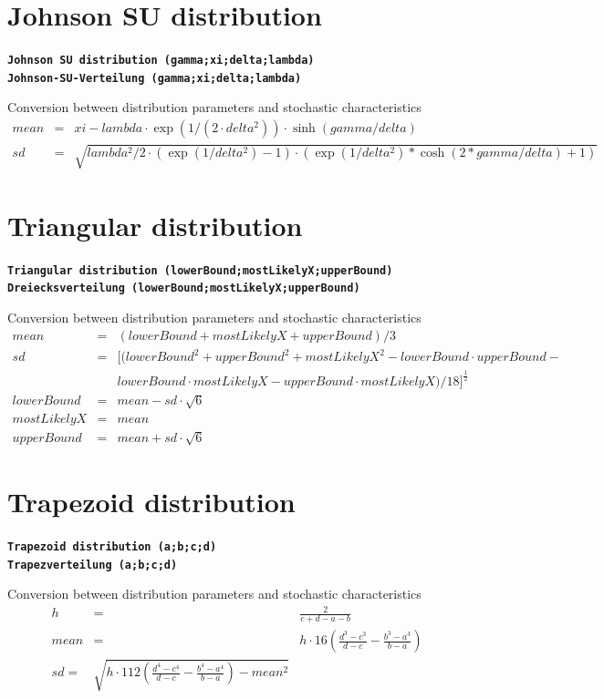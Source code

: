 \documentclass{svmono}
\def\cm#1{\textbf{\texttt{#1}}}
\begin{document}
\section*{Johnson SU distribution}
\cm{Johnson SU distribution (gamma;xi;delta;lambda)}~\\
\cm{Johnson-SU-Verteilung (gamma;xi;delta;lambda)}

Conversion between distribution parameters and stochastic characteristics
\begin{eqnarray*}
mean&=&xi-lambda\cdot\exp(1/(2\cdot delta^2))\cdot\sinh(gamma/delta)\\
sd&=&\sqrt{lambda^2/2\cdot(\exp(1/delta^2)-1)\cdot(\exp(1/delta^2)*\cosh(2*gamma/delta)+1)}
\end{eqnarray*}





\section*{Triangular distribution}
\cm{Triangular distribution (lowerBound;mostLikelyX;upperBound)}~\\
\cm{Dreiecksverteilung (lowerBound;mostLikelyX;upperBound)}

Conversion between distribution parameters and stochastic characteristics
\begin{eqnarray*}
mean&=&(lowerBound+mostLikelyX+upperBound)/3\\
sd&=&\Big[(lowerBound^2+upperBound^2+mostLikelyX^2-lowerBound\cdot upperBound-\\
~&~&lowerBound\cdot mostLikelyX-upperBound\cdot mostLikelyX)/18\Big]^{\frac{1}{2}}\\
lowerBound&=&mean-sd\cdot\sqrt{6}\\
mostLikelyX&=&mean\\
upperBound&=&mean+sd\cdot\sqrt{6}
\end{eqnarray*}





\section*{Trapezoid distribution}
\cm{Trapezoid distribution (a;b;c;d)}~\\
\cm{Trapezverteilung (a;b;c;d)}

Conversion between distribution parameters and stochastic characteristics
\begin{eqnarray*}
h&=&\frac{2}{c+d-a-b}\\
mean&=&h\cdot{1}{6}\left(\frac{d^3-c^3}{d-c}-\frac{b^3-a^3}{b-a}\right)\\
sd=&\sqrt{h\cdot{1}{12}\left(\frac{d^4-c^4}{d-c}-\frac{b^4-a^4}{b-a}\right)-mean^2}
\end{eqnarray*}
\end{document}
